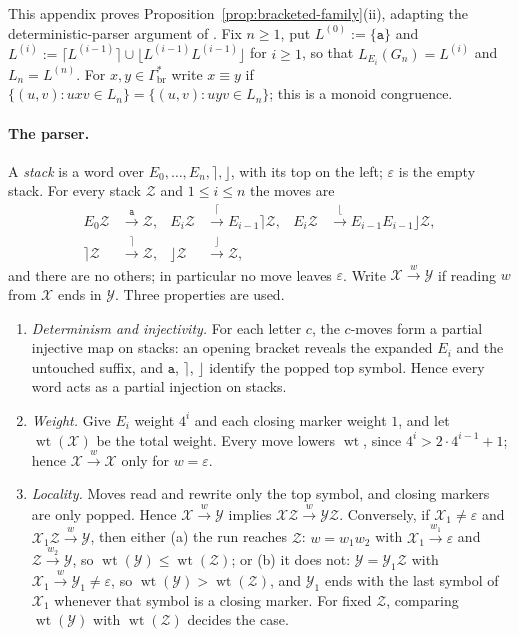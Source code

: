 \documentclass[11pt]{article}
\numberwithin{equation}{section}
\theoremstyle{plain}
\theoremstyle{definition}
\theoremstyle{remark}
\newcommand{\eps}{\varepsilon}
\begin{document}
This appendix proves Proposition~\ref{prop:bracketed-family}(ii), adapting
the deterministic-parser argument of \cite{kuriyamaCFG}. Fix $n\ge1$, put
$L^{(0)}:=\{\mathtt a\}$ and
$L^{(i)}:=\lceil L^{(i-1)}\rceil\cup\lfloor L^{(i-1)}L^{(i-1)}\rfloor$ for
$i\ge1$, so that $L_{E_i}(G_n)=L^{(i)}$ and $L_n=L^{(n)}$. For
$x,y\in\Gamma_{\mathrm{br}}^*$ write $x\equiv y$ if
$\{(u,v):uxv\in L_n\}=\{(u,v):uyv\in L_n\}$; this is a monoid congruence.

\paragraph{The parser.}
A \emph{stack} is a word over $E_0,\ldots,E_n,\rceil,\rfloor$, with its
top on the left; $\eps$ is the empty stack. For every stack $\mathcal Z$ and
$1\le i\le n$ the moves are
\[
\begin{aligned}
E_0\mathcal Z&\xrightarrow{\mathtt a}\mathcal Z,&
E_i\mathcal Z&\xrightarrow{\lceil}E_{i-1}\rceil\mathcal Z,&
E_i\mathcal Z&\xrightarrow{\lfloor}E_{i-1}E_{i-1}\rfloor\mathcal Z,\\
\rceil\mathcal Z&\xrightarrow{\rceil}\mathcal Z,&
\rfloor\mathcal Z&\xrightarrow{\rfloor}\mathcal Z,
\end{aligned}
\]
and there are no others; in particular no move leaves $\eps$. Write
$\mathcal X\xrightarrow{w}\mathcal Y$ if reading $w$ from $\mathcal X$ ends in
$\mathcal Y$. Three properties are used.
\begin{enumerate}[label=\textup{(P\arabic*)},leftmargin=2.6em]
\item \emph{Determinism and injectivity.} For each letter $c$, the
$c$-moves form a partial injective map on stacks: an opening bracket
reveals the expanded $E_i$ and the untouched suffix, and $\mathtt a$,
$\rceil$, $\rfloor$ identify the popped top symbol. Hence every word acts
as a partial injection on stacks.
\item \emph{Weight.} Give $E_i$ weight $4^i$ and each closing marker
weight $1$, and let $\operatorname{wt}(\mathcal X)$ be the total weight. Every
move lowers $\operatorname{wt}$, since $4^i>2\cdot4^{i-1}+1$; hence
$\mathcal X\xrightarrow{w}\mathcal X$ only for $w=\eps$.
\item \emph{Locality.} Moves read and rewrite only the top symbol, and
closing markers are only popped. Hence $\mathcal X\xrightarrow{w}\mathcal Y$
implies $\mathcal X\mathcal Z\xrightarrow{w}\mathcal Y\mathcal Z$. Conversely, if
$\mathcal X_1\ne\eps$ and $\mathcal X_1\mathcal Z\xrightarrow{w}\mathcal Y$, then either
\textup{(a)} the run reaches $\mathcal Z$: $w=w_1w_2$ with
$\mathcal X_1\xrightarrow{w_1}\eps$ and $\mathcal Z\xrightarrow{w_2}\mathcal Y$, so
$\operatorname{wt}(\mathcal Y)\le\operatorname{wt}(\mathcal Z)$; or \textup{(b)} it
does not: $\mathcal Y=\mathcal Y_1\mathcal Z$ with $\mathcal X_1\xrightarrow{w}\mathcal Y_1\ne\eps$,
so $\operatorname{wt}(\mathcal Y)>\operatorname{wt}(\mathcal Z)$, and $\mathcal Y_1$
ends with the last symbol of $\mathcal X_1$ whenever that symbol is a closing
marker. For fixed $\mathcal Z$, comparing $\operatorname{wt}(\mathcal Y)$ with
$\operatorname{wt}(\mathcal Z)$ decides the case.
\end{enumerate}
\end{document}

